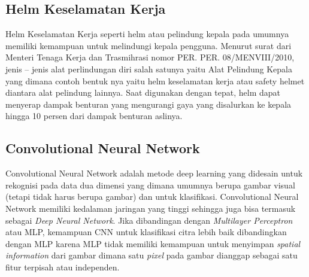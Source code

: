 

\subsection{Helm Keselamatan Kerja}
\label{sec:helmkeselamatankerja}

Helm Keselamatan Kerja seperti helm atau pelindung kepala pada umumnya memiliki kemampuan untuk melindungi kepala pengguna. Menurut surat dari Menteri Tenaga Kerja dan Trasmihrasi nomor PER. PER. 08/MENVIII/2010, jenis – jenis alat perlindungan diri salah satunya yaitu Alat Pelindung Kepala yang dimana contoh bentuk nya yaitu helm keselamatan kerja atau safety helmet diantara alat pelindung lainnya. 
Saat digunakan dengan tepat, helm dapat menyerap dampak benturan yang mengurangi gaya yang disalurkan ke kepala hingga 10 persen dari dampak benturan aslinya. \cite{}


\subsection{Convolutional Neural Network}
\label{sec:convolutionalneuralnetwork}



Convolutional Neural Network adalah metode deep learning yang didesain untuk rekognisi pada data dua 
dimensi yang dimana umumnya berupa gambar visual (tetapi tidak harus berupa gambar) dan untuk klasifikasi.
Convolutional Neural Network memiliki kedalaman jaringan yang tinggi sehingga juga bisa termasuk sebagai \emph{Deep Neural Network}.
Jika dibandingan dengan \emph{Multilayer Perceptron} atau MLP, kemampuan CNN untuk klasifikasi citra lebih baik dibandingkan dengan MLP karena MLP tidak memiliki
kemampuan untuk menyimpan \emph{spatial information} dari gambar dimana satu \emph{pixel} pada gambar dianggap sebagai satu fitur
terpisah atau independen.

